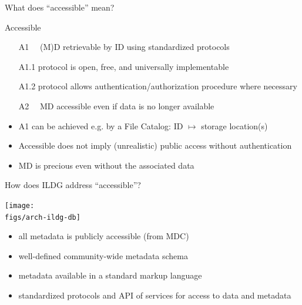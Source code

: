 \documentclass[aspectratio=169,xcolor=dvipsnames]{beamer}
\def\figs{figs2}
\begin{document}
\begin{frame}{What does ``accessible'' mean?}
  \begin{alertblock}{Accessible}
    \begin{itemize}
      \item[A1~~] (M)D retrievable by ID using standardized protocols 
      \item[A1.1] protocol is open, free, and universally implementable 
      \item[A1.2] protocol allows authentication/authorization procedure where necessary 
      \item[A2~~] MD accessible even if data is no longer available
    \end{itemize}
  \end{alertblock}

  \begin{itemize}
  \item A1 can be achieved e.g. by a File Catalog: ID $\mapsto$ storage location(s)
  \item Accessible does not imply (unrealistic) public access without authentication
  \item MD is precious even without the associated data 
  \end{itemize}

  \vfill

\end{frame}
\begin{frame}{How does ILDG address ``accessible''?}
  \begin{center}
    \texttt{[image: \\figs/arch-ildg-db]}
  \end{center}
  \begin{itemize}
  \item all metadata is \alert{publicly} accessible (from MDC)
  \item well-defined community-wide metadata \alert{schema}
  \item metadata available in a standard \alert{markup} language 
  \item standardized protocols and API of \alert{services} for access to data and metadata
  \end{itemize}
\end{frame}
\end{document}
